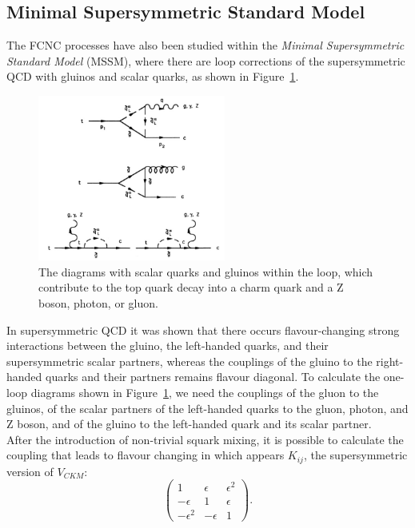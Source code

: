 \subsection{Minimal Supersymmetric Standard Model}
The FCNC processes have also been studied within the \textit{Minimal Supersymmetric Standard Model} (MSSM), where there are loop corrections of the supersymmetric QCD with gluinos 
and scalar quarks, as shown in Figure~\ref{fig:fey_mssm}.
\begin{figure}[!h]
	\centering
	\includegraphics[width=0.55\textwidth]{Chapters/CH1/figures/fey_mssm}
	\caption{The diagrams with scalar quarks and gluinos within the loop, which contribute to the top quark decay into a charm quark and a Z boson, photon, or gluon\cite{coulture_mssm}.}
	\label{fig:fey_mssm}
\end{figure}
In supersymmetric QCD it was shown that there occurs flavour-changing strong interactions between the gluino, the left-handed quarks, and their supersymmetric scalar
partners, whereas the couplings of the gluino to the right-handed quarks and their partners remains flavour diagonal.
To calculate the one-loop diagrams shown in Figure~\ref{fig:fey_mssm}, we need the couplings of the gluon to the gluinos, of the
scalar partners of the left-handed quarks to the gluon, photon, and Z boson, and of the gluino to the left-handed quark and its scalar partner.\\
After the introduction of non-trivial squark mixing, it is possible to calculate the coupling that leads to flavour changing in which appears $K_{ij}$, the supersymmetric version of $V_{CKM}$:
\begin{equation}
\begin{pmatrix}
	1                  & \epsilon   & \epsilon^2 \\ 
	-\epsilon     & 1              & \epsilon \\ 
	-\epsilon^2 & -\epsilon & 1
\end{pmatrix} .
\end{equation}
